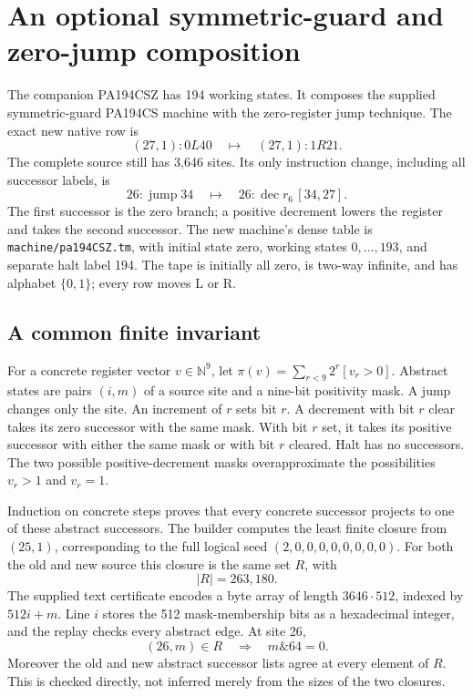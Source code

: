 \section{An optional symmetric-guard and zero-jump composition}
\label{sec:csz}

The companion PA194CSZ has 194 working states. It composes the supplied
symmetric-guard PA194CS machine with the zero-register jump technique.
The exact new native row is
\[
 (27,1):0L40\quad\longmapsto\quad(27,1):1R21.
\]
The complete source still has 3,646 sites. Its only instruction change,
including all successor labels, is
\[
 26:\operatorname{jump}34
 \quad\longmapsto\quad
 26:\operatorname{dec}r_6\,[34,27].
\]
The first successor is the zero branch; a positive decrement lowers the
register and takes the second successor. The new machine's dense table is
\texttt{machine/pa194CSZ.tm}, with initial state zero, working states
$0,\ldots,193$, and separate halt label 194. The tape is initially all zero,
is two-way infinite, and has alphabet $\{0,1\}$; every row moves L or R.

\subsection{A common finite invariant}
For a concrete register vector $v\in\mathbb N^9$, let
$\pi(v)=\sum_{r<9}2^r[v_r>0]$. Abstract states are pairs $(i,m)$ of a source
site and a nine-bit positivity mask. A jump changes only the site.
An increment of $r$ sets bit $r$. A decrement with bit $r$ clear takes its
zero successor with the same mask. With bit $r$ set, it takes its positive
successor with either the same mask or with bit $r$ cleared. Halt has no
successors. The two possible positive-decrement masks overapproximate the
possibilities $v_r>1$ and $v_r=1$.

Induction on concrete steps proves that every concrete successor projects
to one of these abstract successors. The builder computes the least finite
closure from $(25,1)$, corresponding to the full logical seed
$(2,0,0,0,0,0,0,0,0)$. For both the old and new source this closure is the
same set $R$, with
\[
 |R|=263{,}180.
\]
The supplied text certificate encodes a byte array of length $3646\cdot512$,
indexed by $512i+m$. Line $i$ stores the 512 mask-membership bits as a
hexadecimal integer, and the replay checks every abstract edge. At site 26,
\[
 (26,m)\in R\quad\Longrightarrow\quad m\mathbin{\&}64=0.
\]
Moreover the old and new abstract successor lists agree at every element
of $R$. This is checked directly, not inferred merely from the sizes of
the two closures.

